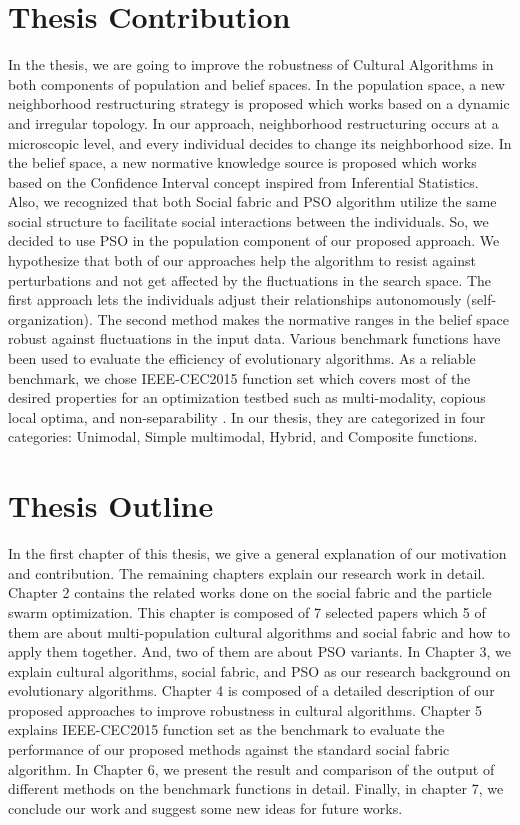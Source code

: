 \section{Thesis Contribution}
In the thesis, we are going to improve the robustness of Cultural Algorithms in both components of population and belief spaces. In the population space, a new neighborhood restructuring strategy is proposed which works based on a dynamic and irregular topology. In our approach, neighborhood restructuring occurs at a microscopic level, and every individual decides to change its neighborhood size. In the belief space, a new normative knowledge source is proposed which works based on the Confidence Interval concept inspired from Inferential Statistics. Also, we recognized that both Social fabric and PSO algorithm utilize the same social structure to facilitate social interactions between the individuals. So, we decided to use PSO in the population component of our proposed approach. We hypothesize that both of our approaches help the algorithm to resist against perturbations and not get affected by the fluctuations in the search space. The first approach lets the individuals adjust their relationships autonomously (self-organization). The second method makes the normative ranges in the belief space robust against fluctuations in the input data. \newline Various benchmark functions have been used to evaluate the efficiency of evolutionary algorithms. As a reliable benchmark, we chose IEEE-CEC2015 function set which covers most of the desired properties for an optimization testbed such as multi-modality, copious local optima, and non-separability \citet{chen2014problem}. In our thesis, they are categorized in four categories: Unimodal, Simple multimodal, Hybrid, and Composite functions.
\section{Thesis Outline}
In the first chapter of this thesis, we give a general explanation of our motivation and contribution. The remaining chapters explain our research work in detail. Chapter 2 contains the related works done on the social fabric and the particle swarm optimization. This chapter is composed of 7 selected papers which 5 of them are about multi-population cultural algorithms and social fabric and how to apply them together. And, two of them are about PSO variants. In Chapter 3, we explain cultural algorithms, social fabric, and PSO as our research background on evolutionary algorithms. Chapter 4 is composed of a detailed description of our proposed approaches to improve robustness in cultural algorithms. Chapter 5 explains IEEE-CEC2015 function set as the benchmark to evaluate the performance of our proposed methods against the standard social fabric algorithm. In Chapter 6, we present the result and comparison of the output of different methods on the benchmark functions in detail. Finally, in chapter 7, we conclude our work and suggest some new ideas for future works.
